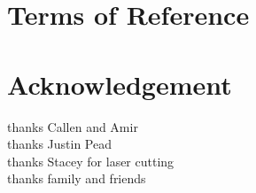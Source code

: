 \documentclass{article}
\begin{document}
\newpage


\section*{Terms of Reference}


\section*{Acknowledgement}
thanks Callen and Amir \\
thanks Justin Pead \\
thanks Stacey for laser cutting \\
thanks family and friends

\newpage


\tableofcontents
\newpage

\listoffigures
\listoftables

\newpage





\newpage




\newpage
\end{document}
